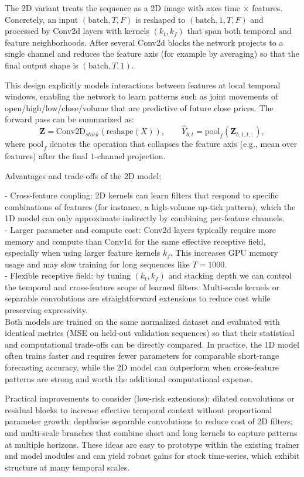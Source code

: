 \documentclass[sigconf]{acmart}
\begin{document}
The 2D variant treats the sequence as a 2D image with axes time $\times$ features. Concretely, an input $(\text{batch}, T, F)$ is reshaped to $(\text{batch}, 1, T, F)$ and processed by Conv2d layers with kernels $(k_t, k_f)$ that span both temporal and feature neighborhoods. After several Conv2d blocks the network projects to a single channel and reduces the feature axis (for example by averaging) so that the final output shape is $(\text{batch}, T, 1)$.

This design explicitly models interactions between features at local temporal windows, enabling the network to learn patterns such as joint movements of open/high/low/close/volume that are predictive of future close prices. The forward pass can be summarized as:
$$
\mathbf{Z} = \text{Conv2D}_{stack}(\text{reshape}(X)),\qquad \hat{Y}_{b,t} = \text{pool}_{f}(\mathbf{Z}_{b,1,t,:}),
$$
where $\text{pool}_{f}$ denotes the operation that collapses the feature axis (e.g., mean over features) after the final $1$-channel projection.

Advantages and trade-offs of the 2D model:

- Cross-feature coupling: 2D kernels can learn filters that respond to specific combinations of features (for instance, a high-volume up-tick pattern), which the 1D model can only approximate indirectly by combining per-feature channels. \\
- Larger parameter and compute cost: Conv2d layers typically require more memory and compute than Conv1d for the same effective receptive field, especially when using larger feature kernels $k_f$. This increases GPU memory usage and may slow training for long sequences like $T=1000$. \\
- Flexible receptive field: by tuning $(k_t, k_f)$ and stacking depth we can control the temporal and cross-feature scope of learned filters. Multi-scale kernels or separable convolutions are straightforward extensions to reduce cost while preserving expressivity.
\\
Both models are trained on the same normalized dataset and evaluated with identical metrics (MSE on held-out validation sequences) so that their statistical and computational trade-offs can be directly compared. In practice, the 1D model often trains faster and requires fewer parameters for comparable short-range forecasting accuracy, while the 2D model can outperform when cross-feature patterns are strong and worth the additional computational expense.

Practical improvements to consider (low-risk extensions): dilated convolutions or residual blocks to increase effective temporal context without proportional parameter growth; depthwise separable convolutions to reduce cost of 2D filters; and multi-scale branches that combine short and long kernels to capture patterns at multiple horizons. These ideas are easy to prototype within the existing trainer and model modules and can yield robust gains for stock time-series, which exhibit structure at many temporal scales.
\end{document}
